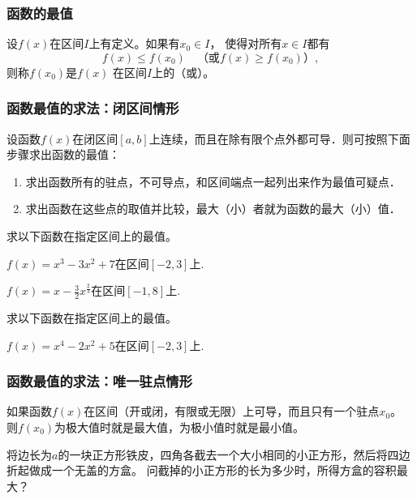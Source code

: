 \documentclass[14pt,notheorems,leqno,xcolor={rgb}]{beamer} %
\begin{document}
\begin{frame}
\frametitle{函数的最值}
\begin{definition}
设$f(x)$在区间$I$上有定义。如果有$x_0\in I$，
使得对所有$x\in I$都有
$$f(x)\le f(x_0) \quad\text{（或$f(x)\ge f(x_0)$）},$$
则称$f(x_0)$是$f(x)$ 在区间$I$上的（或）。
\end{definition}
\end{frame}

\begin{frame}
\frametitle{函数最值的求法：闭区间情形}
设函数$f(x)$在闭区间$[a,b]$上连续，而且在除有限个点外都可导．则可按照下面步骤求出函数的最值：\pause
\begin{enumerate}
  \item 求出函数所有的驻点，不可导点，和区间端点一起列出来作为最值可疑点．\pause
  \item 求出函数在这些点的取值并比较，最大（小）者就为函数的最大（小）值．
\end{enumerate}
\end{frame}

\begin{frame}
\begin{example}
求以下函数在指定区间上的最值。
\begin{enumlite}
  \item $f(x)=x^3-3x^2+7$在区间$[-2,3]$上. \pause
  \item $f(x)=x-\frac32x^{\frac23}$在区间$[-1,8]$上.
\end{enumlite}
\end{example}
\vpause
\begin{exercise}
求以下函数在指定区间上的最值。
\begin{enumlite}
  \item $f(x)=x^4-2x^2+5$在区间$[-2,3]$上.
\end{enumlite}
\end{exercise}
\end{frame}

\begin{frame}
\frametitle{函数最值的求法：唯一驻点情形}
如果函数$f(x)$在区间（开或闭，有限或无限）上可导，而且只有一个驻点$x_0$。
则$f(x_0)$为极大值时就是最大值，为极小值时就是最小值。
\end{frame}

\begin{frame}
\begin{example}
将边长为$a$的一块正方形铁皮，四角各截去一个大小相同的小正方形，然后将四边折起做成一个无盖的方盒。
问截掉的小正方形的长为多少时，所得方盒的容积最大？
\end{example}
\end{frame}
\end{document}
